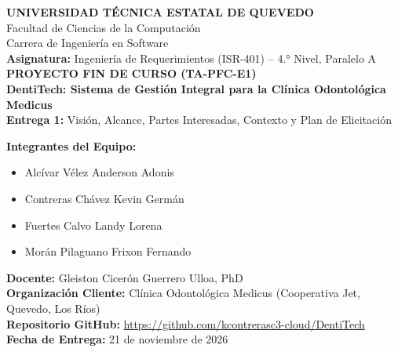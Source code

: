 \documentclass[12pt,a4paper]{article}
\begin{document}
\begin{titlepage}
    \centering
    {\Large \textbf{UNIVERSIDAD T{\'E}CNICA ESTATAL DE QUEVEDO}}\\[0.3cm]
    {\large Facultad de Ciencias de la Computaci{\'o}n}\\
    {\large Carrera de Ingenier{\'i}a en Software}\\[1.5cm]
    {\large \textbf{Asignatura:} Ingenier{\'i}a de Requerimientos (ISR-401) -- 4.° Nivel, Paralelo A}\\[0.5cm]
    {\Large \textbf{PROYECTO FIN DE CURSO (TA-PFC-E1)}}\\[0.4cm]
    {\LARGE \textbf{DentiTech: Sistema de Gesti{\'o}n Integral para la Cl{\'i}nica Odontol{\'o}gica Medicus}}\\[1cm]
    {\large \textbf{Entrega 1:} Visi{\'o}n, Alcance, Partes Interesadas, Contexto y Plan de Elicitaci{\'o}n}\\[1.5cm]
    \begin{flushleft}
    \textbf{Integrantes del Equipo:}\\
    \begin{itemize}
        \item Alc{\'i}var V{\'e}lez Anderson Adonis
        \item Contreras Ch{\'a}vez Kevin Germ{\'a}n
        \item Fuertes Calvo Landy Lorena
        \item Mor{\'a}n Pilaguano Frixon Fernando
    \end{itemize}
    \vspace{0.6cm}
    \textbf{Docente:} Gleiston Cicer{\'o}n Guerrero Ulloa, PhD\\
    \textbf{Organizaci{\'o}n Cliente:} Cl{\'i}nica Odontol{\'o}gica Medicus (Cooperativa Jet, Quevedo, Los R{\'i}os)\\
    \textbf{Repositorio GitHub:} \url{https://github.com/kcontrerasc3-cloud/DentiTech}\\
    \textbf{Fecha de Entrega:} 21 de noviembre de 2026
    \end{flushleft}
\end{titlepage}

\tableofcontents
\newpage

\end{document}
